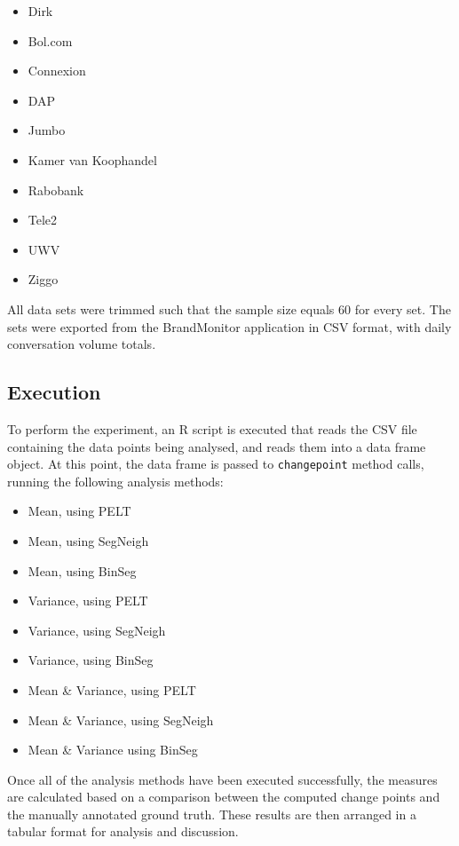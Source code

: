 \documentclass{uvamscse}	%
\begin{document}
\begin{itemize}
    \item Dirk
    \item Bol.com
    \item Connexion
    \item DAP
    \item Jumbo
    \item Kamer van Koophandel
    \item Rabobank
    \item Tele2
    \item UWV
    \item Ziggo
\end{itemize}

All data sets were trimmed such that the sample size equals 60 for every set. The sets were exported from the BrandMonitor application in CSV format, with daily conversation volume totals.

\subsection{Execution}

To perform the experiment, an \textsf{R} script is executed that reads the CSV file containing the data points being analysed, and reads them into a data frame object. At this point, the data frame is passed to \texttt{changepoint} method calls, running the following analysis methods:

\begin{itemize}
    \item Mean, using PELT
    \item Mean, using SegNeigh
    \item Mean, using BinSeg
    \item Variance, using PELT
    \item Variance, using SegNeigh
    \item Variance, using BinSeg
    \item Mean \& Variance, using PELT
    \item Mean \& Variance, using SegNeigh
    \item Mean \& Variance using BinSeg
\end{itemize}

Once all of the analysis methods have been executed successfully, the measures are calculated based on a comparison between the computed change points and the manually annotated ground truth. These results are then arranged in a tabular format for analysis and discussion.
\end{document}
